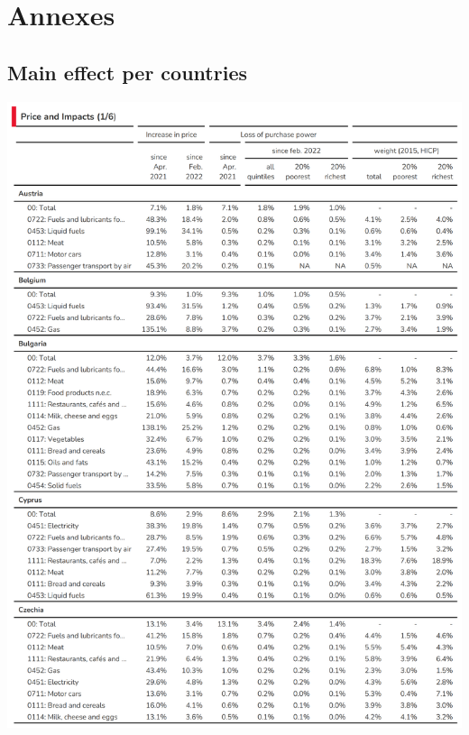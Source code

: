 \documentclass[
  9pt,
  a4paper,
  DIV=11,
  numbers=noendperiod]{scrartcl}
\begin{document}
\newpage

\hypertarget{annexes}{%
\section{Annexes}\label{annexes}}

\hypertarget{main-effect-per-countries}{%
\subsection{Main effect per countries}\label{main-effect-per-countries}}

\includegraphics[width=17cm,height=\textheight]{../svg/annex_1.png}
\end{document}
